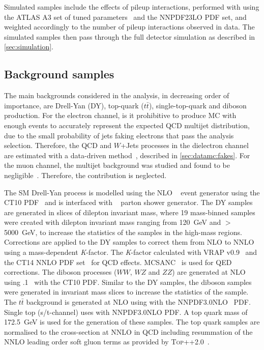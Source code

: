 Simulated samples include the effects of pileup interactions, performed with  using the ATLAS A3 set of tuned parameters~\cite{ATL-PHYS-PUB-2016-017} and the NNPDF23LO PDF set, and weighted accordingly to the number of pileup interactions observed in data. The simulated samples then pass through the full detector simulation as described in \cref{sec:simulation}. 

\subsection{Background samples}\label{sec:datamc:mc:bkg}
The main backgrounds considered in the analysis, in decreasing order of importance, are Drell-Yan (DY), top-quark ($t\bar{t}$), single-top-quark and diboson production. For the electron channel, is it prohibitive to produce MC with enough events to accurately represent the expected QCD multijet distribution, due to the small probability of jets faking electrons that pass the analysis selection. Therefore, the QCD and $W$+Jets processes in the dielectron channel are estimated with a data-driven method~\cite{EXOT-2016-05}, described in \cref{sec:datamc:fakes}. For the muon channel, the multijet background was studied and found to be negligible~\cite{EXOT-2016-05}. Therefore, the contribution is neglected. 

The SM Drell-Yan process is modelled using the NLO \POWHEGBOX~\cite{Alioli:2010xd,Frixione:2007vw} event generator using the CT10 PDF~\cite{ct10} and is interfaced with ~\cite{pythia8} parton shower generator. The DY samples are generated in slices of dilepton invariant mass, where 19 mass-binned samples were created with dilepton invariant mass ranging from \SI{120}{\giga\electronvolt} and $>$ \SI{5000}{\giga\electronvolt}, to increase the statistics of the samples in the high-mass regions. Corrections are applied to the DY samples to correct them from NLO to NNLO using a mass-dependent \emph{K}-factor. The \emph{K}-factor calculated with {\textsc{VRAP}} v0.9~\cite{vrap} and the CT14 NNLO PDF set~\cite{CT14} for QCD effects. {\textsc{MCSANC}}~\cite{MCSANC} is used for QED corrections. The diboson processes ($WW$, $WZ$ and $ZZ$) are generated at NLO using .1~\cite{Gleisberg:2008ta} with the CT10 PDF. Similar to the DY samples, the diboson samples were generated in invariant mass slices to increase the statistics of the sample. The $t\bar{t}$ background is generated at NLO using \POWHEGBOX with the NNPDF3.0NLO~\cite{Ball:2014uwa} PDF. Single top (s/t-channel) uses \POWHEGBOX with NNPDF3.0NLO PDF. A top quark mass of \SI{172.5}{\giga\electronvolt} is used for the generation of these samples. The top quark samples are normalised to the cross-section at NNLO in QCD including resummation of the NNLO leading order soft gluon terms as provided by \textsc{Top++}2.0~\cite{Czakon:2011xx}.

